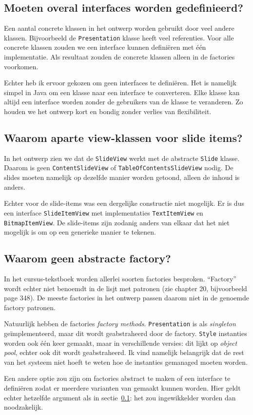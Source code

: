 \documentclass[a4paper]{article}
\newcommand{\question}[1]{
  \subsection{#1}
}
\newcommand{\code}[1]{\lstinline[columns=fixed]{#1}}
\begin{document}
	\question{Moeten overal interfaces worden gedefinieerd?}\label{q:interfaces}
		Een aantal concrete klassen in het ontwerp worden gebruikt door veel andere klassen.
		Bijvoorbeeld de \code{Presentation} klasse heeft veel referenties.
		Voor alle concrete klassen zouden we een interface kunnen definiëren met één implementatie.
		Als resultaat zouden de concrete klassen alleen in de factories voorkomen.

		Echter heb ik ervoor gekozen om geen interfaces te definiëren.
		Het is namelijk simpel in Java om een klasse naar een interface te converteren.
		Elke klasse kan altijd een interface worden zonder de gebruikers van de klasse te veranderen.
		Zo houden we het ontwerp kort en bondig zonder verlies van flexibiliteit.

	\question{Waarom aparte view-klassen voor slide items?}
		In het ontwerp zien we dat de \code{SlideView} werkt met de abstracte \code{Slide} klasse.
		Daarom is geen \code{ContentSlideView} of \code{TableOfContentsSlideView} nodig.
		De slides moeten namelijk op dezelfde manier worden getoond, alleen de inhoud is anders.

		Echter voor de slide-items was een dergelijke constructie niet mogelijk.
		Er is dus een interface \code{SlideItemView} met implementaties \code{TextItemView} en \code{Bitmap}\-\code{ItemView}.
		De slide-items zijn zodanig anders van elkaar dat het niet mogelijk is om op een generieke manier te tekenen.

	\question{Waarom geen abstracte factory?}
		In het cursus-tekstboek worden allerlei soorten factories besproken.
		``Factory'' wordt echter niet benoemdt in de lisjt met patronen (zie chapter 20, bijvoorbeeld page 348).
		De meeste factories in het ontwerp passen daarom niet in de genoemde factory patronen.

		Natuurlijk hebben de factories \textit{factory methods}.
		\code{Presentation} is als \textit{singleton} geïmplementeerd, maar dit wordt geabstraheerd door de factory.
		\code{Style} instanties worden ook één keer gemaakt, maar in verschillende versies: dit lijkt op \textit{object pool}, echter ook dit wordt geabstraheerd.
		Ik vind namelijk belangrijk dat de rest van het systeem niet hoeft te weten hoe de instanties gemanaged moeten worden.

		Een andere optie zou zijn om factories abstract te maken of een interface te definiëren zodat er meerdere varianten van gemaakt kunnen worden.
		Hier geldt echter hetzelfde argument als in sectie~\ref{q:interfaces}: het zou ingewikkelder worden dan noodzakelijk.
\end{document}
